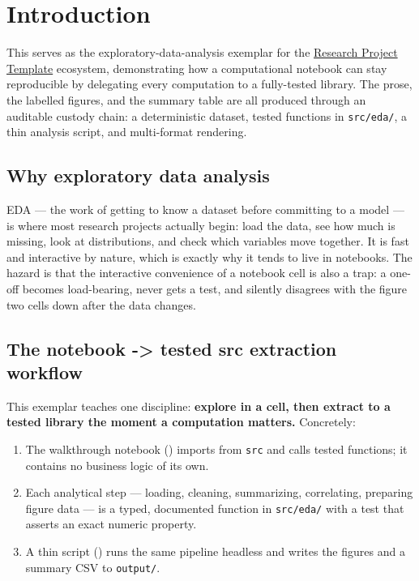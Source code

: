 \documentclass[
]{article}
\providecommand{\tightlist}{%
  \setlength{\itemsep}{0pt}\setlength{\parskip}{0pt}}
\begin{document}
\newpage

\section{Introduction}\label{sec:introduction}

This  serves as the
exploratory-data-analysis exemplar for the
\href{https://github.com/docxology/template}{Research Project Template}
ecosystem, demonstrating how a computational notebook can stay
reproducible by delegating every computation to a fully-tested library.
The prose, the labelled figures, and the summary table are all produced
through an auditable custody chain: a deterministic dataset, tested
functions in \texttt{src/eda/}, a thin analysis script, and multi-format
rendering.

\subsection{Why exploratory data
analysis}\label{why-exploratory-data-analysis}

EDA --- the work of getting to know a dataset before committing to a
model --- is where most research projects actually begin: load the data,
see how much is missing, look at distributions, and check which
variables move together. It is fast and interactive by nature, which is
exactly why it tends to live in notebooks. The hazard is that the
interactive convenience of a notebook cell is also a trap: a one-off
 becomes load-bearing, never gets a test,
and silently disagrees with the figure two cells down after the data
changes.

\subsection{The notebook -\textgreater{} tested src extraction
workflow}\label{the-notebook---tested-src-extraction-workflow}

This exemplar teaches one discipline: \textbf{explore in a cell, then
extract to a tested library the moment a computation matters.}
Concretely:

\begin{enumerate}
\def\labelenumi{\arabic{enumi}.}
\tightlist
\item
  The walkthrough notebook ()
  imports from \texttt{src} and calls tested functions; it contains no
  business logic of its own.
\item
  Each analytical step --- loading, cleaning, summarizing, correlating,
  preparing figure data --- is a typed, documented function in
  \texttt{src/eda/} with a test that asserts an exact numeric property.
\item
  A thin script () runs the same
  pipeline headless and writes the figures and a summary CSV to
  \texttt{output/}.
\end{enumerate}
\end{document}
